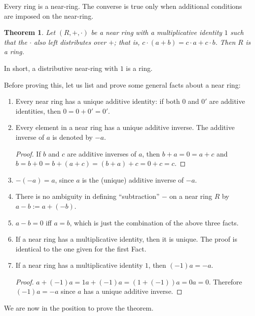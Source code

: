 \documentclass[12pt]{article}
\newtheorem{thm}{Theorem}
\begin{document}

Every ring is a near-ring.  The converse is true only when additional conditions are imposed on the near-ring.

\begin{thm} Let $(R,+,\cdot)$ be a near ring with a multiplicative identity $1$ such that the $\cdot$ also left distributes over $+$; that is, $c\cdot (a+b)=c\cdot a+c\cdot b$.  Then $R$ is a ring.\end{thm}

In short, a distributive near-ring with $1$ is a ring.

Before proving this, let us list and prove some general facts about a near ring:
\begin{enumerate}
\item Every near ring has a unique additive identity: if both $0$ and $0'$ are additive identities, then $0=0+0'=0'$.
\item Every element in a near ring has a unique additive inverse.  The additive inverse of $a$ is denoted by $-a$.
\begin{proof} If $b$ and $c$ are additive inverses of $a$, then $b+a=0=a+c$ and $b=b+0=b+(a+c)=(b+a)+c=0+c=c$. \end{proof}
\item $-(-a)=a$, since $a$ is the (unique) additive inverse of $-a$.
\item There is no ambiguity in defining ``subtraction'' $-$ on a near ring $R$ by $a-b:=a+(-b)$.
\item \label{c} $a-b=0$ iff $a=b$, which is just the combination of the above three facts.
\item If a near ring has a multiplicative identity, then it is unique.  The proof is identical to the one given for the first Fact.
\item \label{w} If a near ring has a multiplicative identity $1$, then $(-1)a=-a$.
\begin{proof} $a+(-1)a=1a+(-1)a=(1+(-1))a=0a=0$.  Therefore $(-1)a=-a$ since $a$ has a unique additive inverse. \end{proof}
\end{enumerate}
We are now in the position to prove the theorem.
\end{document}
